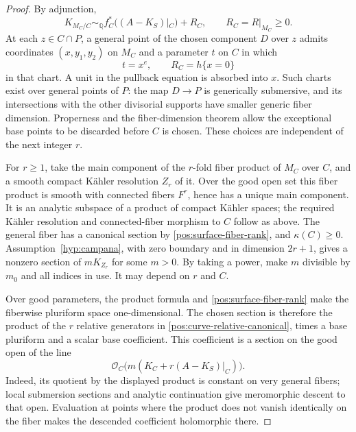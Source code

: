 \documentclass[11pt,letterpaper]{article}
\theoremstyle{definition}
\theoremstyle{remark}
\begin{document}
\begin{proof}
By adjunction,
\begin{equation}\label{pos:curve-relative-canonical}
 K_{M_C/C}\sim_{\mathbb{Q}} f_C^*((A-K_S)|_C)+R_C,
 \qquad R_C=R|_{M_C}\geq0.
\end{equation}
At each \(z\in C\cap P\), a general point of the chosen component
\(D\) over \(z\) admits coordinates \((x,y_1,y_2)\) on \(M_C\)
and a parameter \(t\) on \(C\) in which
\begin{equation}\label{pos:surface-local-chart}
 t=x^e,\qquad R_C=h\{x=0\}
\end{equation}
in that chart. A unit in the pullback equation is absorbed into \(x\).
Such charts exist over general points of \(P\): the map \(D\to P\)
is generically submersive, and its intersections with the other
divisorial supports have smaller generic fiber dimension. Properness
and the fiber-dimension theorem allow the exceptional base points to
be discarded before \(C\) is chosen. These choices are independent of
the next integer \(r\).

For \(r\geq1\), take the main component of the \(r\)-fold fiber
product of \(M_C\) over \(C\), and a smooth compact Kähler resolution
\(Z_r\) of it. Over the good open set this fiber product is smooth
with connected fibers \(F^r\), hence has a unique main component.
It is an analytic subspace of a product of compact Kähler spaces;
the required Kähler resolution and connected-fiber morphism to \(C\)
follow as above. The general fiber has a canonical section by
\eqref{pos:surface-fiber-rank}, and \(\kappa(C)\geq0\).
Assumption~\ref{hyp:campana}, with zero boundary and in dimension
\(2r+1\), gives a nonzero section of \(mK_{Z_r}\) for some \(m>0\).
By taking a power, make \(m\) divisible by \(m_0\) and all indices
in use. It may depend on \(r\) and \(C\).

Over good parameters, the product formula and
\eqref{pos:surface-fiber-rank} make the fiberwise pluriform space
one-dimensional. The chosen section is therefore the product of the
\(r\) relative generators in
\eqref{pos:curve-relative-canonical}, times a base pluriform and a
scalar base coefficient. This coefficient is a section on the good
open of the line
\begin{equation}\label{pos:fiber-power-coefficient-line}
 \mathcal{O}_C\bigl(m(K_C+r(A-K_S)|_C)\bigr).
\end{equation}
Indeed, its quotient by the displayed product is constant on very
general fibers; local submersion sections and analytic continuation
give meromorphic descent to that open. Evaluation at points where the
product does not vanish identically on the fiber makes the descended
coefficient holomorphic there.


\end{proof}
\end{document}
